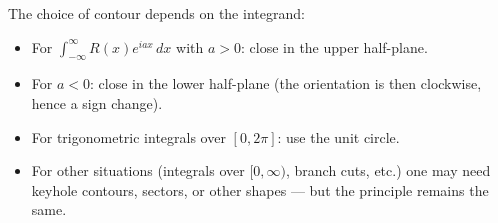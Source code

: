 \begin{remark}
The choice of contour depends on the integrand:
\begin{itemize}
\item For $\int_{-\infty}^\infty R(x)e^{iax}\,dx$ with $a>0$: close in the upper half-plane.
\item For $a<0$: close in the lower half-plane (the orientation is then clockwise, hence a sign change).
\item For trigonometric integrals over $[0,2\pi]$: use the unit circle.
\item For other situations (integrals over $[0,\infty)$, branch cuts, etc.) one may need keyhole contours, sectors, or other shapes — but the principle remains the same.
\end{itemize}
\end{remark}
